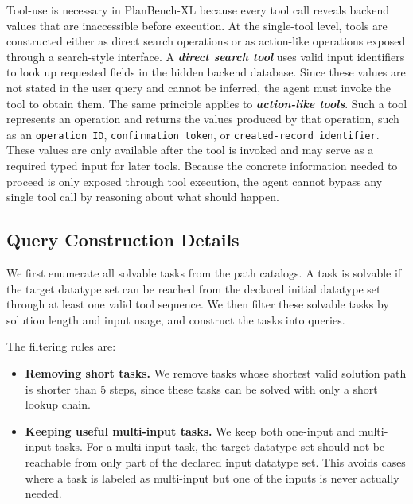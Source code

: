 \documentclass{llmxive}
\providecommand{\bench}[1]{PlanBench-XL}
\begin{document}

Tool-use is necessary in \bench{} because every tool call reveals backend values that are inaccessible before execution.
At the single-tool level, tools are constructed either as direct search operations or as action-like operations exposed through a search-style interface. 
A \textit{\textbf{direct search tool}} uses valid input identifiers to look up requested fields in the hidden backend database. Since these values are not stated in the user query and cannot be inferred, the agent must invoke the tool to obtain them.
The same principle applies to \textit{\textbf{action-like tools}}. 
Such a tool represents an operation and returns the values produced by that operation, such as an \texttt{operation ID}, \texttt{confirmation token}, or \texttt{created-record identifier}.
These values are only available after the tool is invoked and may serve as a required typed input for later tools. 
Because the concrete information needed to proceed is only exposed through tool execution, the agent cannot bypass any single tool call by reasoning about what should happen.

\subsection{Query Construction Details}
\label{app:query-construction-details}


We first enumerate all solvable tasks from the path catalogs. 
A task is solvable if the target datatype set can be reached from the declared initial datatype set through at least one valid tool sequence. 
We then filter these solvable tasks by solution length and input usage, and construct the tasks into queries.

The filtering rules are:
\begin{itemize}
    \item \textbf{Removing short tasks.} We remove tasks whose shortest valid solution path is shorter than 5 steps, since these tasks can be solved with only a short lookup chain.
    \item \textbf{Keeping useful multi-input tasks.} We keep both one-input and multi-input tasks. For a multi-input task, the target datatype set should not be reachable from only part of the declared input datatype set. This avoids cases where a task is labeled as multi-input but one of the inputs is never actually needed.
\end{itemize}
\end{document}
